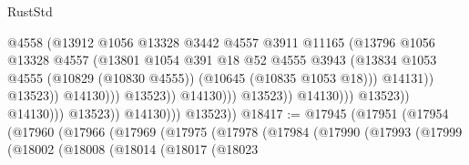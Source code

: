 \begin{lexlean}{RustStd}
\begin{coremodule}
                                                        @4558
                                                        (@13912
                                                          @1056
                                                          @13328
                                                          @3442
                                                          @4557
                                                          @3911
                                                          @11165
                                                          (@13796
                                                            @1056
                                                            @13328
                                                            @4557
                                                            (@13801
                                                              @1054
                                                              @391
                                                              @18
                                                              @52
                                                              @4555
                                                              @3943
                                                              (@13834
                                                                @1053
                                                                @4555
                                                                (@10829 (@10830 @4555))
                                                                (@10645 (@10835 @1053 @18)))
                                                              @14131))
                                                          @13523))
                                                      @14130)))
                                                @13523))
                                            @14130)))
                                      @13523))
                                  @14130)))
                            @13523))
                        @14130)))
                  @13523))
              @14130)))
        @13523))
@18417 := @17945
    (@17951
      (@17954
        (@17960
          (@17966
            (@17969
              (@17975
                (@17978
                  (@17984
                    (@17990
                      (@17993
                        (@17999
                          (@18002
                            (@18008
                              (@18014
                                (@18017
                                  (@18023

\end{coremodule}
\end{lexlean}

